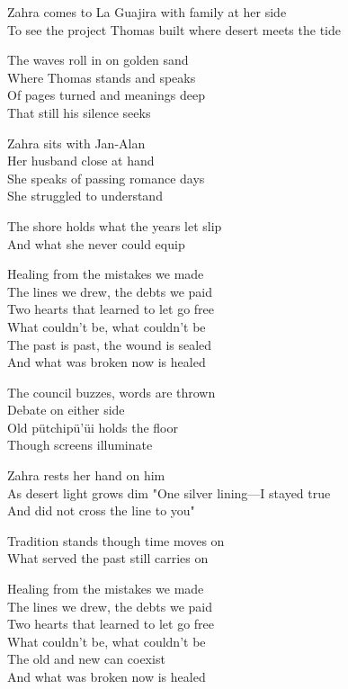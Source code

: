 \begin{lyrics}
Zahra comes to La Guajira with family at her side\\
To see the project Thomas built where desert meets the tide


The waves roll in on golden sand\\
Where Thomas stands and speaks\\
Of pages turned and meanings deep\\
That still his silence seeks

Zahra sits with Jan-Alan\\
Her husband close at hand\\
She speaks of passing romance days\\
She struggled to understand

The shore holds what the years let slip\\
And what she never could equip

Healing from the mistakes we made\\
The lines we drew, the debts we paid\\
Two hearts that learned to let go free\\
What couldn't be, what couldn't be\\
The past is past, the wound is sealed\\
And what was broken now is healed

The council buzzes, words are thrown\\
Debate on either side\\
Old pütchipü'üi holds the floor\\
Though screens illuminate

Zahra rests her hand on him\\
As desert light grows dim
"One silver lining—I stayed true\\
And did not cross the line to you"

Tradition stands though time moves on\\
What served the past still carries on

Healing from the mistakes we made\\
The lines we drew, the debts we paid\\
Two hearts that learned to let go free\\
What couldn't be, what couldn't be\\
The old and new can coexist\\
And what was broken now is healed


\end{lyrics}

